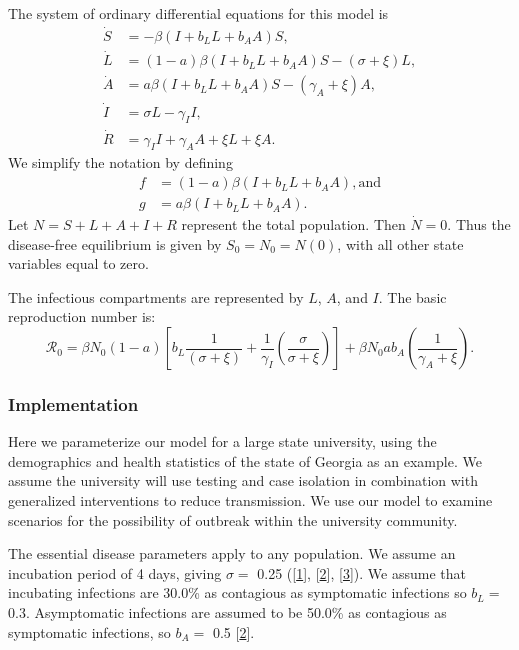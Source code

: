 \documentclass[
]{article}
\begin{document}
The system of ordinary differential equations for this model is
\begin{align*}
\dot{S} & =-\beta\left(I+b_{L}L+b_{A}A\right)S,\\
\dot{L} & =\left(1-a\right)\beta\left(I+b_{L}L+b_{A}A\right)S-\left(\sigma+\xi\right)L,\\
\dot{A} & =a\beta\left(I+b_{L}L+b_{A}A\right)S-\left(\gamma_{A}+\xi\right)A,\\
\dot{I} & =\sigma L-\gamma_{I}I,\\
\dot{R} & =\gamma_{I}I+\gamma_{A}A+\xi L+\xi A.
\end{align*} We simplify the notation by defining \begin{align*}
f & =\left(1-a\right)\beta\left(I+b_{L}L+b_{A}A\right), \text{and}\\
g & =a\beta\left(I+b_{L}L+b_{A}A\right).
\end{align*} Let \(N=S+L+A+I+R\) represent the total population. Then
\(\dot{N}=0\). Thus the disease-free equilibrium is given by
\(S_{0}=N_{0}=N\left(0\right)\), with all other state variables equal to
zero.

The infectious compartments are represented by \(L\), \(A\), and \(I\).
The basic reproduction number is: \[
\mathcal{R}_{0}=\beta N_{0}\left(1-a\right)\left[b_{L}\frac{1}{\left(\sigma+\xi\right)}+\frac{1}{\gamma_{I}}\left(\frac{\sigma}{\sigma+\xi}\right)\right]+\beta N_{0}ab_{A}\left(\frac{1}{\gamma_{A}+\xi}\right).
\]

\hypertarget{implementation}{%
\subsubsection{Implementation}\label{implementation}}

Here we parameterize our model for a large state university, using the
demographics and health statistics of the state of Georgia as an
example. We assume the university will use testing and case isolation in
combination with generalized interventions to reduce transmission. We
use our model to examine scenarios for the possibility of outbreak
within the university community.

The essential disease parameters apply to any population. We assume an
incubation period of 4 days, giving \(\sigma=\) 0.25
({[}\protect\hyperlink{ref-Zhang2020-ih}{1}{]},
{[}\protect\hyperlink{ref-Li2020-hc}{2}{]},
{[}\protect\hyperlink{ref-Lauer2020-mr}{3}{]}). We assume that
incubating infections are 30.0\% as contagious as symptomatic infections
so \(b_{L}=\) 0.3. Asymptomatic infections are assumed to be 50.0\% as
contagious as symptomatic infections, so \(b_{A} =\) 0.5
{[}\protect\hyperlink{ref-Li2020-hc}{2}{]}.
\end{document}
